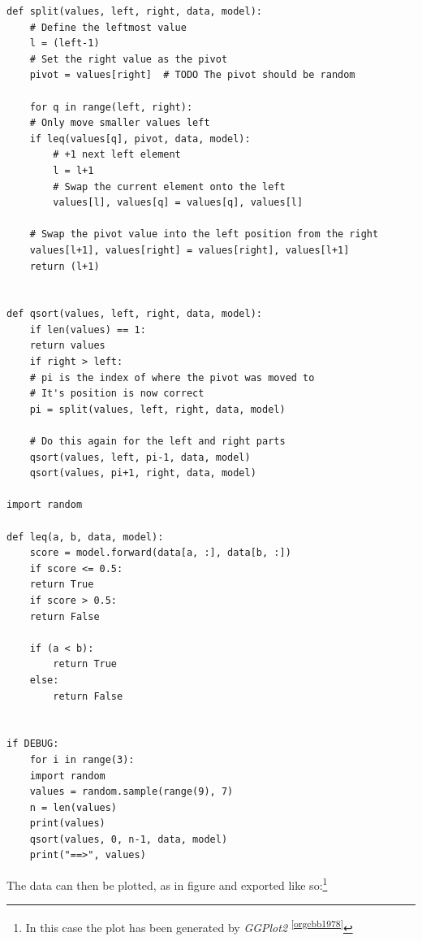 \documentclass[a4paper,11pt,twoside]{article}
\begin{document}
\begin{verbatim}
def split(values, left, right, data, model):
    # Define the leftmost value
    l = (left-1)
    # Set the right value as the pivot
    pivot = values[right]  # TODO The pivot should be random

    for q in range(left, right):
	# Only move smaller values left
	if leq(values[q], pivot, data, model):
	    # +1 next left element
	    l = l+1
	    # Swap the current element onto the left
	    values[l], values[q] = values[q], values[l]

    # Swap the pivot value into the left position from the right
    values[l+1], values[right] = values[right], values[l+1]
    return (l+1)


def qsort(values, left, right, data, model):
    if len(values) == 1:
	return values
    if right > left:
	# pi is the index of where the pivot was moved to
	# It's position is now correct
	pi = split(values, left, right, data, model)

	# Do this again for the left and right parts
	qsort(values, left, pi-1, data, model)
	qsort(values, pi+1, right, data, model)

import random

def leq(a, b, data, model):
    score = model.forward(data[a, :], data[b, :])
    if score <= 0.5:
	return True
    if score > 0.5:
	return False

	if (a < b):
	    return True
	else:
	    return False


if DEBUG:
    for i in range(3):
	import random
	values = random.sample(range(9), 7)
	n = len(values)
	print(values)
	qsort(values, 0, n-1, data, model)
	print("==>", values)

\end{verbatim}

The data can then be plotted, as in figure and exported like so:\footnote{In this case the plot has been generated by \emph{GGPlot2} \textsuperscript{\ref{orgcbb1978}}}
\end{document}
